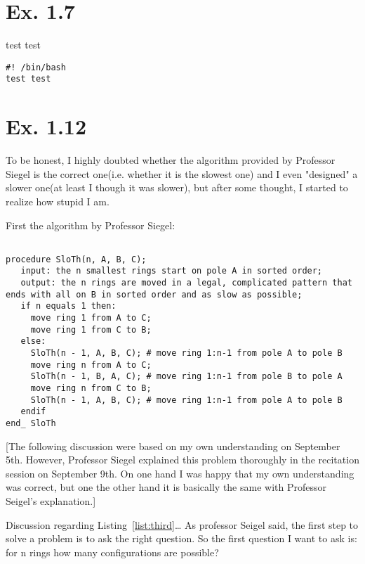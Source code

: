 \documentclass[a4paper,11pt]{article}
\theoremstyle{mytheor}
\begin{document}
\section*{Ex. 1.7}
test test
\begin{lstlisting}[label={list:tenth},caption=Sample Bash code.]
#! /bin/bash
test test
\end{lstlisting}



\section*{Ex. 1.12}

To be honest, I highly doubted whether the algorithm provided by Professor Siegel is the correct one(i.e. whether it is the slowest one) and I even "designed" a slower one(at least I though it was slower), but after some thought, I started to realize how stupid I am.

First the algorithm by Professor Siegel:

\begin{lstlisting}[label={list:eleventh},caption=Pseudo code -- slow Towers of Hanoi.]

procedure SloTh(n, A, B, C);
   input: the n smallest rings start on pole A in sorted order;
   output: the n rings are moved in a legal, complicated pattern that ends with all on B in sorted order and as slow as possible;
   if n equals 1 then:
     move ring 1 from A to C;
     move ring 1 from C to B;
   else:
     SloTh(n - 1, A, B, C); # move ring 1:n-1 from pole A to pole B
     move ring n from A to C;
     SloTh(n - 1, B, A, C); # move ring 1:n-1 from pole B to pole A
     move ring n from C to B;
     SloTh(n - 1, A, B, C); # move ring 1:n-1 from pole A to pole B
   endif
end_ SloTh

\end{lstlisting}

[The following discussion were based on my own understanding on September 5th. However, Professor Siegel explained this problem thoroughly in the recitation session on September 9th. On one hand I was happy that my own understanding was correct, but one the other hand it is basically the same with Professor Seigel's explanation.]

Discussion regarding Listing~\ref{list:third}\ldots{} 
As professor Seigel said, the first step to solve a problem is to ask the right question. So the first question I want to ask is: for n rings how many configurations are possible?
\end{document}
